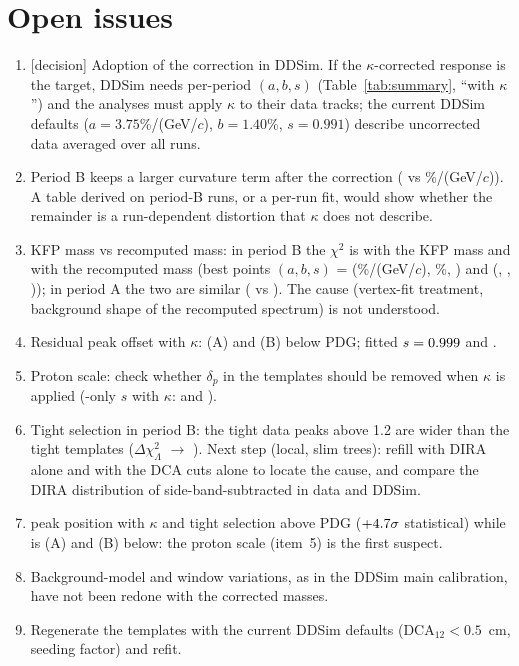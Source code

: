 \section{Open issues}
\label{sec:open}

\begin{enumerate}
\item {[decision]} Adoption of the correction in DDSim. If the $\kappa$-corrected response is the target, DDSim needs
  per-period $(a,b,s)$ (Table~\ref{tab:summary}, ``with $\kappa$'') and the analyses must apply $\kappa$ to their data tracks;
  the current DDSim defaults ($a=3.75$\%/(GeV/$c$), $b=1.40$\%, $s=0.991$) describe uncorrected data averaged over all runs.
\item Period B keeps a larger curvature term after the correction (\PerBKapKsA{} vs \PerAKapKsA\%/(GeV/$c$)). A table derived on
  period-B runs, or a per-run fit, would show whether the remainder is a run-dependent distortion that $\kappa$ does not describe.
\item KFP mass vs recomputed mass: in period B the \Ks{} $\chi^2$ is \PerBKfpKsChi{} with the KFP mass and \PerBRawKsChi{} with the
  recomputed mass (best points $(a,b,s)$ = (\PerBKfpKsA\%/(GeV/$c$), \PerBKfpKsB\%, \PerBKfpKsS) and
  (\PerBRawKsA, \PerBRawKsB, \PerBRawKsS)); in period A the two are similar (\PerAKfpKsChi{} vs \PerARawKsChi). The cause
  (vertex-fit treatment, background shape of the recomputed spectrum) is not understood.
\item Residual \Ks{} peak offset with $\kappa$: \PerAKapKsBelow{} (A) and \PerBKapKsBelow\mevcc{} (B) below PDG; fitted
  $s=0.999$ and \PerBKapKsS.
\item Proton scale: check whether $\delta_p$ in the templates should be removed when $\kappa$ is applied (\La-only $s$ with
  $\kappa$: \PerAKapLaS{} and \PerBKapLaS).
\item Tight \La{} selection in period B: the tight data peaks above 1.2\gevc{} are wider than the tight templates
  ($\Delta\chi^2_\Lambda$ \PerBKapQaDchi{} $\to$ \PerBKapTiDchi). Next step (local, slim trees): refill with DIRA alone and with the DCA
  cuts alone to locate the cause, and compare the DIRA distribution of side-band-subtracted \La{} in data and DDSim.
\item \La{} peak position with $\kappa$ and tight selection \PerAllKapLpTiAbove\mevcc{} above PDG
  ($+4.7\sigma$ statistical) while \Ks{} is \PerAKapKsBelow{} (A) and \PerBKapKsBelow\mevcc{} (B) below: the proton scale (item~5) is the first
  suspect.
\item Background-model and window variations, as in the DDSim main calibration, have not been redone with the corrected masses.
\item Regenerate the templates with the current DDSim defaults (DCA$_{12}<0.5$~cm, seeding factor) and refit.
\end{enumerate}

